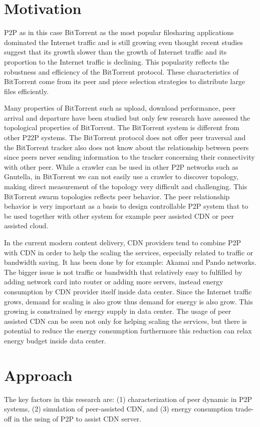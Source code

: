 \section{Motivation}
P2P as in this case BitTorrent as the most popular filesharing applications dominated the Internet traffic and is still growing even thought recent studies suggest that its growth slower than the growth of Internet traffic and its proportion to the Internet traffic is declining.
This popularity reflects the robustness and efficiency of the BitTorrent protocol.
These characteristics of BitTorrent come from its peer and piece selection strategies to distribute large files efficiently.  

Many properties of BitTorrent such as upload, download performance, peer arrival and departure have been studied but only few research have assessed the topological properties of BitTorrent.  
The BitTorrent system is different from other P22P systems. 
The BitTorrent protocol does not offer peer traversal and the BitTorrent tracker also does not know about the relationship between peers since peers never sending information to the tracker concerning their connectivity with other peer.  
While a crawler can be used in other P2P networks such as Gnutella, in BitTorrent we can not easily use a crawler to discover topology, making direct measurement of the topology very difficult and challenging. 
This BitTorrent swarm topologies reflects peer behavior.
The peer relationship behavior is very important as a basis to design controllable P2P system that to be used together with other system for example peer assisted CDN or peer assisted cloud. 

In the current modern content delivery, CDN providers tend to combine P2P with CDN in order to help the scaling the services, especially related to traffic or bandwidth saving.
It has been done by for example: Akamai and Pando networks.
The bigger issue is not traffic or bandwidth that relatively easy to fulfilled by adding network card into router or adding more servers, instead energy consumption by CDN provider itself inside data center.
Since the Internet traffic grows, demand for scaling is also grow thus demand for energy is also grow.  
This growing is constrained by energy supply in data center.
The usage of peer assisted CDN can be seen not only for helping scaling the services, but there is potential to reduce the energy consumption furthermore this reduction can relax energy budget inside data center. 


\section{Approach}
The key factors in this research are: (1) characterization of peer dynamic in P2P systems, (2) simulation of peer-assisted CDN, and (3) energy consumption trade-off in the using of P2P to assist CDN server.

